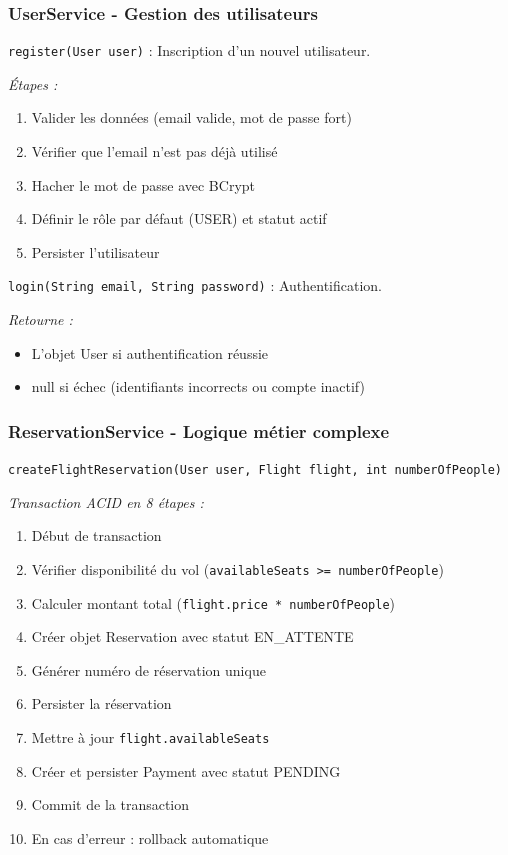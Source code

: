 \documentclass[12pt,a4paper]{report}
\begin{document}
\subsubsection{UserService - Gestion des utilisateurs}

\texttt{register(User user)} : Inscription d'un nouvel utilisateur.

\textit{Étapes :}
\begin{enumerate}
    \item Valider les données (email valide, mot de passe fort)
    \item Vérifier que l'email n'est pas déjà utilisé
    \item Hacher le mot de passe avec BCrypt
    \item Définir le rôle par défaut (USER) et statut actif
    \item Persister l'utilisateur
\end{enumerate}

\texttt{login(String email, String password)} : Authentification.

\textit{Retourne :}
\begin{itemize}
    \item L'objet User si authentification réussie
    \item null si échec (identifiants incorrects ou compte inactif)
\end{itemize}

\subsubsection{ReservationService - Logique métier complexe}

\texttt{createFlightReservation(User user, Flight flight, int numberOfPeople)}

\textit{Transaction ACID en 8 étapes :}

\begin{enumerate}
    \item Début de transaction
    \item Vérifier disponibilité du vol (\texttt{availableSeats >= numberOfPeople})
    \item Calculer montant total (\texttt{flight.price * numberOfPeople})
    \item Créer objet Reservation avec statut EN\_ATTENTE
    \item Générer numéro de réservation unique
    \item Persister la réservation
    \item Mettre à jour \texttt{flight.availableSeats}
    \item Créer et persister Payment avec statut PENDING
    \item Commit de la transaction
    \item En cas d'erreur : rollback automatique
\end{enumerate}
\end{document}

